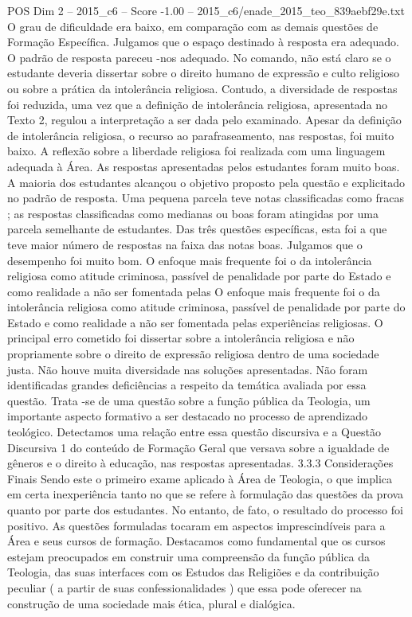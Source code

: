 \begin{textsample}{POS Dim 2 – 2015\_c6 – Score -1.00 – 2015\_c6/enade\_2015\_teo\_839aebf29e.txt}
O grau de dificuldade era baixo, em comparação com as demais questões de Formação Específica.
Julgamos que o espaço destinado à resposta era adequado.
O padrão de resposta pareceu -nos adequado.
No comando, não está claro se o estudante deveria dissertar sobre o direito humano de expressão e culto religioso ou sobre a prática da intolerância religiosa.
Contudo, a diversidade de respostas foi reduzida, uma vez que a definição de intolerância religiosa, apresentada no Texto 2, regulou a interpretação a ser dada pelo examinado.
Apesar da definição de intolerância religiosa, o recurso ao parafraseamento, nas respostas, foi muito baixo.
A reflexão sobre a liberdade religiosa foi realizada com uma linguagem adequada à Área.
As respostas apresentadas pelos estudantes foram muito boas.
A maioria dos estudantes alcançou o objetivo proposto pela questão e explicitado no padrão de resposta.
Uma pequena parcela teve notas classificadas como fracas ; as respostas classificadas como medianas ou boas foram atingidas por uma parcela semelhante de estudantes.
Das três questões específicas, esta foi a que teve maior número de respostas na faixa das notas boas.
Julgamos que o desempenho foi muito bom.
O enfoque mais frequente foi o da intolerância religiosa como atitude criminosa, passível de penalidade por parte do Estado e como realidade a não ser fomentada pelas O enfoque mais frequente foi o da intolerância religiosa como atitude criminosa, passível de penalidade por parte do Estado e como realidade a não ser fomentada pelas experiências religiosas.
O principal erro cometido foi dissertar sobre a intolerância religiosa e não propriamente sobre o direito de expressão religiosa dentro de uma sociedade justa.
Não houve muita diversidade nas soluções apresentadas.
Não foram identificadas grandes deficiências a respeito da temática avaliada por essa questão.
Trata -se de uma questão sobre a função pública da Teologia, um importante aspecto formativo a ser destacado no processo de aprendizado teológico.
Detectamos uma relação entre essa questão discursiva e a Questão Discursiva 1 do conteúdo de Formação Geral que versava sobre a igualdade de gêneros e o direito à educação, nas respostas apresentadas. 3.3.3 Considerações Finais Sendo este o primeiro exame aplicado à Área de Teologia, o que implica em certa inexperiência tanto no que se refere à formulação das questões da prova quanto por parte dos estudantes.
No entanto, de fato, o resultado do processo foi positivo.
As questões formuladas tocaram em aspectos imprescindíveis para a Área e seus cursos de formação.
Destacamos como fundamental que os cursos estejam preocupados em construir uma compreensão da função pública da Teologia, das suas interfaces com os Estudos das Religiões e da contribuição peculiar ( a partir de suas confessionalidades ) que essa pode oferecer na construção de uma sociedade mais ética, plural e dialógica.

\end{textsample}
